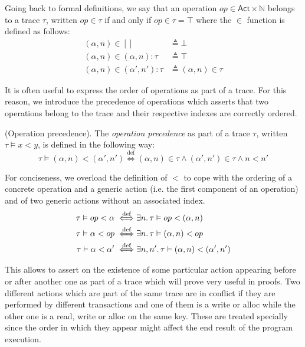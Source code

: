 Going back to formal definitions, we say that an operation $op \in \mathsf{Act} \times \mathds{N}$ belongs to a trace $\tau$, written $op \in \tau$ if and only if $op \in \tau = \top$ where the $\in$ function is defined as follows:
\begin{align*}
	(\alpha, n) \in [] &\triangleq \bot \\
	(\alpha, n) \in (\alpha, n):\tau &\triangleq \top \\
	(\alpha, n) \in (\alpha', n'):\tau &\triangleq (\alpha, n) \in \tau
\end{align*}

It is often useful to express the order of operations as part of a trace. For this reason, we introduce the precedence of operations which asserts that two operations belong to the trace and their respective indexes are correctly ordered.
\begin{defn}
	(Operation precedence).
	The \emph{operation precedence} as part of a trace $\tau$, written $\tau \vDash x < y$, is defined in the following way:
	\[
		\tau \vDash (\alpha, n) < (\alpha', n') \overset{\text{def}}{\iff}
(\alpha, n) \in \tau \land (\alpha', n') \in \tau \land n < n'
	\]
\end{defn}

For conciseness, we overload the definition of $<$ to cope with the ordering of a concrete operation and a generic action (i.e. the first component of an operation) and of two generic actions without an associated index.
\begin{align*}
	\tau \vDash op < \alpha \overset{\text{def}}{\iff}&
	\exists n \ldotp \tau \vDash op < (\alpha, n)
		\\
	\tau \vDash \alpha < op \overset{\text{def}}{\iff}&
	\exists n \ldotp \tau \vDash (\alpha, n) < op
		\\
	\tau \vDash \alpha < \alpha' \overset{\text{def}}{\iff}&
	\exists n, n' \ldotp \tau \vDash (\alpha, n) < (\alpha', n')
\end{align*}

This allows to assert on the existence of some particular action appearing before or after another one as part of a trace which will prove very useful in proofs. Two different actions which are part of the same trace are in conflict if they are performed by different transactions and one of them is a write or alloc while the other one is a read, write or alloc on the same key. These are treated specially since the order in which they appear might affect the end result of the program execution.


